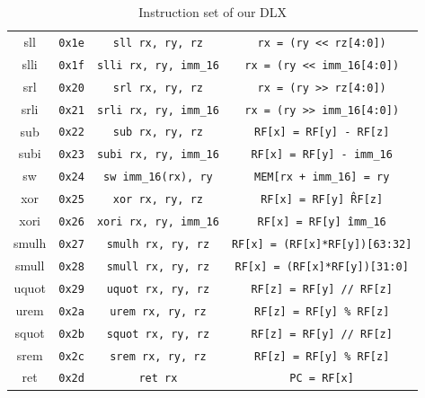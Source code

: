 \begin{table}[]
\begin{tabular}{|c|c|c|c|}
sll & \texttt{0x1e} & \texttt{sll rx, ry, rz} & \texttt{rx = (ry << rz[4:0])} \\

slli & \texttt{0x1f} & \texttt{slli rx, ry, imm\_16} & \texttt{rx = (ry << imm\_16[4:0])} \\

srl & \texttt{0x20} & \texttt{srl rx, ry, rz} & \texttt{rx = (ry >> rz[4:0])} \\

srli & \texttt{0x21} & \texttt{srli rx, ry, imm\_16} & \texttt{rx = (ry >> imm\_16[4:0])} \\

sub  & \texttt{0x22} & \texttt{sub rx, ry, rz} & \texttt{RF[x] = RF[y] - RF[z]} \\

subi & \texttt{0x23} & \texttt{subi rx, ry, imm\_16} & \texttt{RF[x] = RF[y] - imm\_16} \\

sw  & \texttt{0x24} & \texttt{sw imm\_16(rx), ry} & \texttt{MEM[rx + imm\_16] = ry} \\

xor & \texttt{0x25} & \texttt{xor rx, ry, rz} & \texttt{RF[x] = RF[y] \^ RF[z]} \\

xori & \texttt{0x26} & \texttt{xori rx, ry, imm\_16} & \texttt{RF[x] = RF[y] \^ imm\_16} \\

smulh & \texttt{0x27} & \texttt{smulh rx, ry, rz} & \texttt{RF[x] = (RF[x]*RF[y])[63:32]} \\

smull & \texttt{0x28} & \texttt{smull rx, ry, rz} & \texttt{RF[x] = (RF[x]*RF[y])[31:0]} \\

uquot & \texttt{0x29} & \texttt{uquot rx, ry, rz} & \texttt{RF[z] = RF[y] // RF[z]} \\

urem & \texttt{0x2a} & \texttt{urem rx, ry, rz} & \texttt{RF[z] = RF[y] \% RF[z]} \\

squot & \texttt{0x2b} & \texttt{squot rx, ry, rz} & \texttt{RF[z] = RF[y] // RF[z]} \\

srem & \texttt{0x2c} & \texttt{srem rx, ry, rz} & \texttt{RF[z] = RF[y] \% RF[z]} \\

ret & \texttt{0x2d} & \texttt{ret rx} & \texttt{PC = RF[x]} \\
         \hline 
    \end{tabular}
    \caption{Instruction set of our DLX}
    \label{tab:instructionset}
\end{table}

